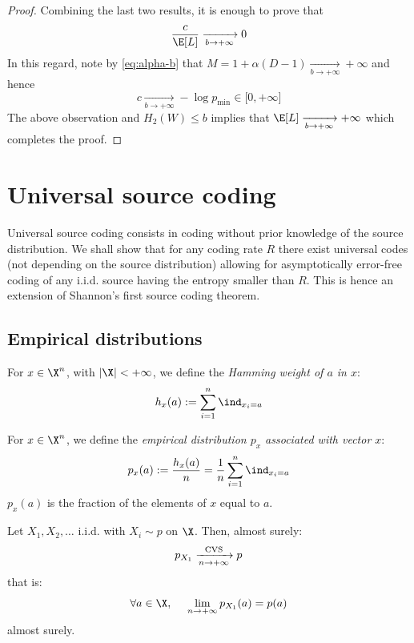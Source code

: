 \documentclass[toc, titlepaged]{../cs-classes/cs-classes}
\begin{document}
\begin{proof}
    Combining the last two results, it is enough to prove that
    \begin{equation*}
        \frac{c}{\E[L]} \xrightarrow[b\to+\infty]{} 0
    \end{equation*}
    In this regard, note by \eqref{eq:alpha-b} that $M=1+\alpha(D-1) \xrightarrow[b\to+\infty]{} +\infty$ and hence
    \begin{equation*}
        c \xrightarrow[b\to+\infty]{} -\log p_{\min} \in \lbrack0, +\infty\rbrack
    \end{equation*}
    The above observation and $H_2(W)\leq b$ implies that $\E[L] \xrightarrow[b\to+\infty]{} +\infty$ which completes the proof.
\end{proof}

\section{Universal source coding}
Universal source coding consists in coding without prior knowledge of the source distribution. We shall show that for any coding rate $R$ there exist universal codes (not depending on the source distribution) allowing for asymptotically error-free coding of any i.i.d. source having the entropy smaller than $R$. This is hence an extension of Shannon's first source coding theorem.

\subsection{Empirical distributions}
\begin{definition}
    For $x\in\X^n$, with $|\X|<+\infty$, we define the \emph{Hamming weight of $a$ in $x$}:
    \begin{equation*}
        h_x(a) := \sum_{i=1}^n \ind_{x_i=a}
    \end{equation*}
\end{definition}

\begin{definition}
    For $x\in\X^n$, we define the \emph{empirical distribution $p_x$ associated with vector $x$}:
    \begin{equation*}
        p_x(a) := \frac{h_x(a)}{n}=\frac{1}{n}\sum_{i=1}^n \ind_{x_i=a}
    \end{equation*}
    $p_x(a)$ is the fraction of the elements of $x$ equal to $a$.
\end{definition}

\begin{property}
    \label{prop:glivenko-cantelli}
    Let $X_1, X_2, \dots$ i.i.d. with $X_i\sim p$ on $\X$. Then, almost surely:
    \begin{equation*}
        p_{X_1} \xrightarrow[n\to+\infty]{\textnormal{CVS}} p
    \end{equation*}
    that is:
    \begin{equation*}
        \forall a\in\X, \quad \lim_{n\to+\infty}p_{X_1}(a)=p(a)
    \end{equation*}
    almost surely.
\end{property}
\end{document}
